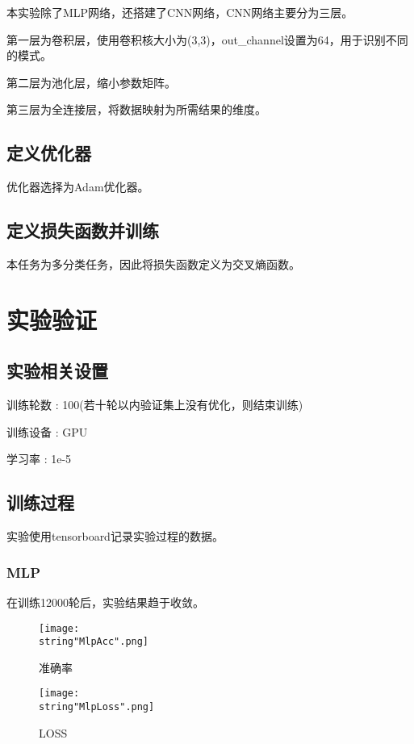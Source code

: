 \documentclass[UTF8]{ctexart}
\begin{document}
本实验除了MLP网络，还搭建了CNN网络，CNN网络主要分为三层。\par
第一层为卷积层，使用卷积核大小为(3,3)，out\_channel设置为64，用于识别不同的模式。\par 
第二层为池化层，缩小参数矩阵。\par
第三层为全连接层，将数据映射为所需结果的维度。\par

\subsection{定义优化器}
优化器选择为Adam优化器。
\subsection{定义损失函数并训练}
本任务为多分类任务，因此将损失函数定义为交叉熵函数。

\section{实验验证}
\subsection{实验相关设置}
训练轮数 : 100(若十轮以内验证集上没有优化，则结束训练)\par
训练设备 : GPU\par 
学习率 : 1e-5\par 
\subsection{训练过程}
实验使用tensorboard记录实验过程的数据。\par
\subsubsection{MLP}

在训练12000轮后，实验结果趋于收敛。\par
\begin{figure}[H]
    \begin{center}
        \texttt{[image: \\string"MlpAcc".png]}
    \caption{准确率}
    \label{fig:1}
    \end{center}
    \end{figure}
\par

\begin{figure}[H]
    \begin{center}
        \texttt{[image: \\string"MlpLoss".png]}
    \caption{LOSS}
    \label{fig:2}
    \end{center}
    \end{figure}
\par
\end{document}
